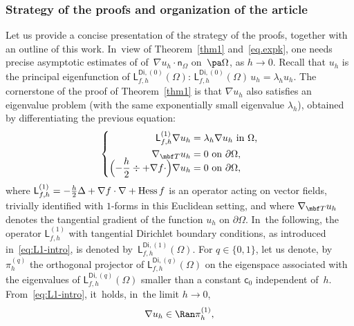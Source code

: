 \subsubsection*{Strategy of the proofs and organization of the article}
Let us provide a concise presentation of the strategy of the proofs,
together with an outline of this work. In~view of Theorem~\ref{thm1} and~\eqref {eq.expk}, one needs precise
asymptotic estimates of of~$\nabla u_h\cdot \mathsf
n_\Omega$ on~$\pa\Omega$, as $h\to 0$. Recall that $u_h$ is the
principal eigenfunction of $\mathsf
L^{\mathsf{Di},(0)}_{f,h}(\Omega)$: $\mathsf L^{\mathsf{Di},(0)}_{f,h}(\Omega)\, u_h = \lambda_h u_h$. The cornerstone of the proof of
Theorem~\ref{thm1} is that $\nabla u_h$ also satisfies an eigenvalue
problem (with the same exponentially small eigenvalue $\lambda_h$), obtained by differentiating the previous equation:\vspace*{-3pt}
\begin{equation}\label{eq:L1-intro}
\left\{
\begin{aligned}
\mathsf L^{(1)}_{f,h} \nabla u_h &= \lambda_h \nabla u_h \text{ in $\Omega$,}\\
\nabla_{\mbf T} u_h& = 0 \text{ on $\partial \Omega$,}\\[-7pt]
\Bigl(-\frac{h}{2} \div + \nabla f \cdot \Bigr) \nabla u_h & = 0 \text{ on $\partial \Omega$,}\\
\end{aligned}
\right.
\end{equation}
where $
\mathsf L^{(1)}_{f,h}=- \frac{h}{2} \Delta + \nabla f \cdot \nabla + {\rm
Hess} \, f$
is an operator acting on vector fields, trivially identified with
$1$-forms in this Euclidean setting, and where $\nabla_{\mbf T}u_h$ denotes the tangential gradient of the function $u_h$ on $\partial \Omega$. In~the
following, the operator $\mathsf L^{(1)}_{f,h}$ with tangential Dirichlet
boundary conditions, as introduced in~\eqref{eq:L1-intro}, is denoted
by~$\mathsf L^{\mathsf{Di},(1)}_{f,h}(\Omega)$.
For $q\in\{0,1\}$, let us denote, by~$ \pi_h^{(q)}$ the orthogonal
projector of $\mathsf L^{\mathsf{Di},(q)}_{f,h}(\Omega)$ on the
eigenspace associated with the eigenvalues of $\mathsf
L^{\mathsf{Di},(q)}_{f,h}(\Omega)$ smaller than a constant $\mathsf
c_0$ independent of~$h$. From~\eqref{eq:L1-intro}, it~holds, in~the
limit $h \to 0$,\vspace*{-3pt}
\begin{equation}\label{eq.nu-in}
\nabla u_h\in \Ran \pi_h^{(1)},
\end{equation}
